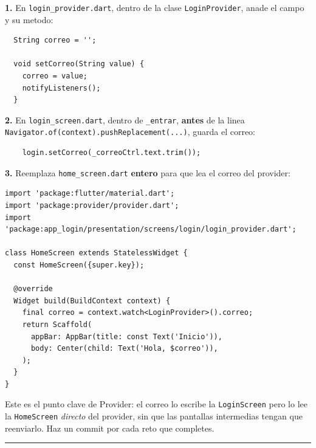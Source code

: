 \documentclass[11pt,a4paper,oneside]{book}
\newcommand{\file}[1]{\texttt{\textcolor{brandDark}{#1}}}
\begin{document}
\noindent\textbf{1.} En \file{login\_provider.dart}, dentro de la clase
\texttt{LoginProvider}, anade el campo y su metodo:
\begin{lstlisting}
  String correo = '';

  void setCorreo(String value) {
    correo = value;
    notifyListeners();
  }
\end{lstlisting}

\noindent\textbf{2.} En \file{login\_screen.dart}, dentro de \texttt{\_entrar},
\textbf{antes} de la linea \texttt{Navigator.of(context).pushReplacement(...)}, guarda
el correo:
\begin{lstlisting}
    login.setCorreo(_correoCtrl.text.trim());
\end{lstlisting}

\noindent\textbf{3.} Reemplaza \file{home\_screen.dart} \textbf{entero} para que lea el
correo del provider:
\begin{lstlisting}
import 'package:flutter/material.dart';
import 'package:provider/provider.dart';
import 'package:app_login/presentation/screens/login/login_provider.dart';

class HomeScreen extends StatelessWidget {
  const HomeScreen({super.key});

  @override
  Widget build(BuildContext context) {
    final correo = context.watch<LoginProvider>().correo;
    return Scaffold(
      appBar: AppBar(title: const Text('Inicio')),
      body: Center(child: Text('Hola, $correo')),
    );
  }
}
\end{lstlisting}

\begin{whatbox}
Este es el punto clave de Provider: el correo lo escribe la \file{LoginScreen} pero lo
lee la \file{HomeScreen} \emph{directo} del provider, sin que las pantallas
intermedias tengan que reenviarlo. Haz un commit por cada reto que completes.
\end{whatbox}

\vspace{6pt}
\noindent\textcolor{midgray}{\rule{\textwidth}{0.4pt}}\\[2pt]
\noindent{\small\textcolor{midgray}{Ultime Team Manager --- Login paso a paso ---
Sebastian Ramirez y Joaquin Parraud.}}
\end{document}
